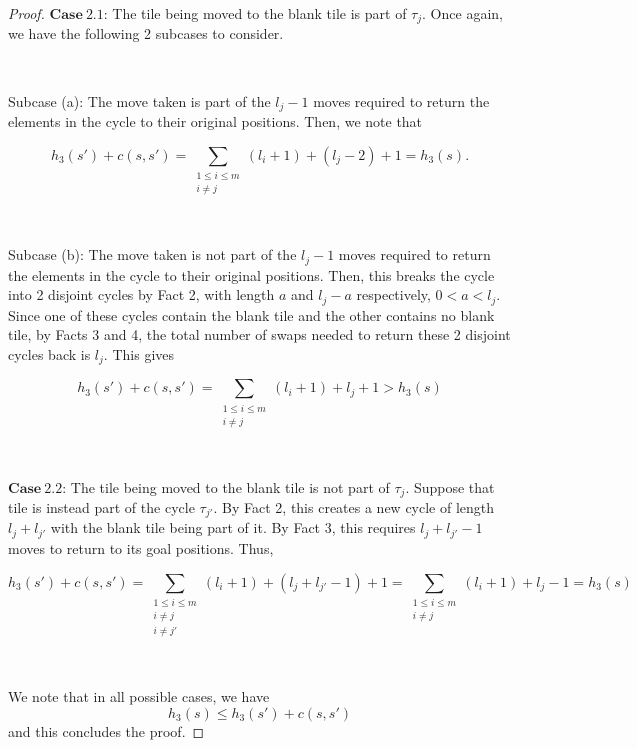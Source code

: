 \documentclass[runningheads]{llncs}
\begin{document}
\begin{proof}
$\mathbf{Case \ 2.1}$: The tile being moved to the blank tile is part of $\tau_j$. Once again, we have the following 2 subcases to consider.

\ 

Subcase (a): The move taken is part of the $l_j - 1$ moves required to return the elements in the cycle to their original positions. Then, we note that

$$
h_3(s') + c(s, s') = \sum_{\substack{1 \leq i \leq m \\ i \neq j}} (l_i + 1) + (l_j - 2) + 1 = h_3(s).
$$

\

Subcase (b): The move taken is not part of the $l_j - 1$ moves required to return the elements in the cycle to their original positions. Then, this breaks the cycle into 2 disjoint cycles by Fact 2, with length $a$ and $l_j - a$ respectively, $0 < a < l_j$. Since one of these cycles contain the blank tile and the other contains no blank tile, by Facts 3 and 4, the total number of swaps needed to return these 2 disjoint cycles back is $l_j$. This gives

$$
h_3(s') + c(s, s') = \sum_{\substack{1 \leq i \leq m \\ i \neq j}} (l_i + 1) + l_j + 1 > h_3(s)
$$

\ 

$\mathbf{Case \ 2.2}$: The tile being moved to the blank tile is not part of $\tau_j$. Suppose that tile is instead part of the cycle $\tau_{j'}$. By Fact 2, this creates a new cycle of length $l_j + l_{j'}$ with the blank tile being part of it. By Fact 3, this requires $l_j + l_{j'} - 1$ moves to return to its goal positions. Thus,

$$
h_3(s') + c(s, s') = \sum_{\substack{1 \leq i \leq m \\ i \neq j \\ i \neq j'}}(l_i + 1) + (l_j + l_{j'} - 1) + 1 
= \sum_{\substack{1 \leq i \leq m \\ i \neq j}}(l_i + 1) + l_j - 1 
= h_3(s)
$$

\

We note that in all possible cases, we have 
$$
h_3(s) \leq h_3(s') + c(s, s') 
$$
and this concludes the proof.

\end{proof}
\end{document}
